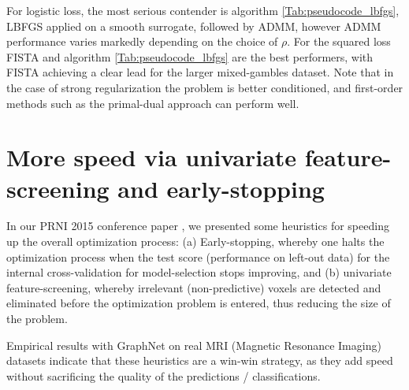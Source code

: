 For logistic loss, the most serious contender is
algorithm \ref{Tab:pseudocode_lbfgs}, LBFGS applied on a smooth
surrogate, followed by ADMM, however ADMM performance
varies markedly depending on the choice of $\rho$. For the squared loss
FISTA and algorithm \ref{Tab:pseudocode_lbfgs} are the best performers,
with FISTA achieving a clear lead for the larger mixed-gambles dataset.
Note that in the case of strong regularization the problem is better
conditioned, and first-order methods such as the
primal-dual approach can perform well.

\section{More speed via univariate feature-screening and early-stopping}
In our PRNI 2015 conference paper  \citep{dohmatob2015speeding}, we presented some heuristics for speeding up the overall optimization process: (a) Early-stopping, whereby one  halts
the optimization process when the test score (performance on left-out
data) for the internal cross-validation for model-selection stops
improving, and (b) univariate feature-screening, whereby irrelevant
(non-predictive) voxels are detected and eliminated before the
optimization problem is entered, thus reducing the size of the
problem.

Empirical results with GraphNet on real MRI (Magnetic
Resonance Imaging)
datasets indicate that these heuristics are a win-win strategy, as
they add speed without sacrificing the quality of the predictions
/ classifications.


